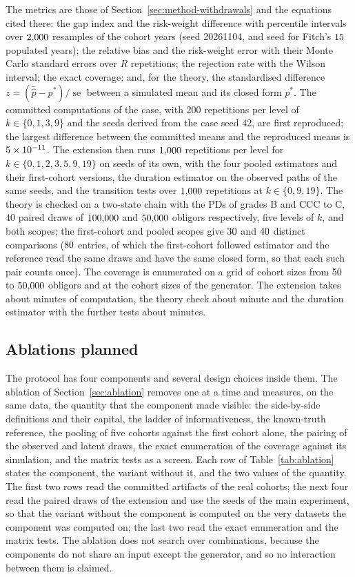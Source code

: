 The metrics are those of Section~\ref{sec:method-withdrawals} and the equations cited there: the gap index and the risk-weight difference with percentile intervals over $2{,}000$ resamples of the cohort years (seed 20261104, and seed \fiPopSeed{} for Fitch's $15$ populated years); the relative bias and the risk-weight error with their Monte Carlo standard errors over $R$ repetitions; the rejection rate with the Wilson interval; the exact coverage; and, for the theory, the standardised difference $z=(\bar{\hat p}-p^{\ast})/\operatorname{se}$ between a simulated mean and its closed form $p^{\ast}$. The committed computations of the case, with 200 repetitions per level of $k\in\{0,1,3,9\}$ and the seeds derived from the case seed 42, are first reproduced; the largest difference between the committed means and the reproduced means is $5\times10^{-11}$. The extension then runs $1{,}000$ repetitions per level for $k\in\{0,1,2,3,5,9,19\}$ on seeds of its own, with the four pooled estimators and their first-cohort versions, the duration estimator on the observed paths of the same seeds, and the transition tests over $1{,}000$ repetitions at $k\in\{0,9,19\}$. The theory is checked on a two-state chain with the PDs of grades B and CCC to C, 40 paired draws of $100{,}000$ and $50{,}000$ obligors respectively, five levels of $k$, and both scopes; the first-cohort and pooled scopes give $30$ and $40$ distinct comparisons ($80$ entries, of which the first-cohort followed estimator and the reference read the same draws and have the same closed form, so that each such pair counts once). The coverage is enumerated on a grid of cohort sizes from 50 to $50{,}000$ obligors and at the cohort sizes of the generator. The extension takes about \minWd{} minutes of computation, the theory check about \minTheory{} minute and the duration estimator with the further tests about \minExtra{} minutes.

\subsection{Ablations planned}
\label{sec:design-ablation}

The protocol has four components and several design choices inside them. The ablation of Section~\ref{sec:ablation} removes one at a time and measures, on the same data, the quantity that the component made visible: the side-by-side definitions and their capital, the ladder of informativeness, the known-truth reference, the pooling of five cohorts against the first cohort alone, the pairing of the observed and latent draws, the exact enumeration of the coverage against its simulation, and the matrix tests as a screen. Each row of Table~\ref{tab:ablation} states the component, the variant without it, and the two values of the quantity. The first two rows read the committed artifacts of the real cohorts; the next four read the paired draws of the extension and use the seeds of the main experiment, so that the variant without the component is computed on the very datasets the component was computed on; the last two read the exact enumeration and the matrix tests. The ablation does not search over combinations, because the components do not share an input except the generator, and so no interaction between them is claimed.

